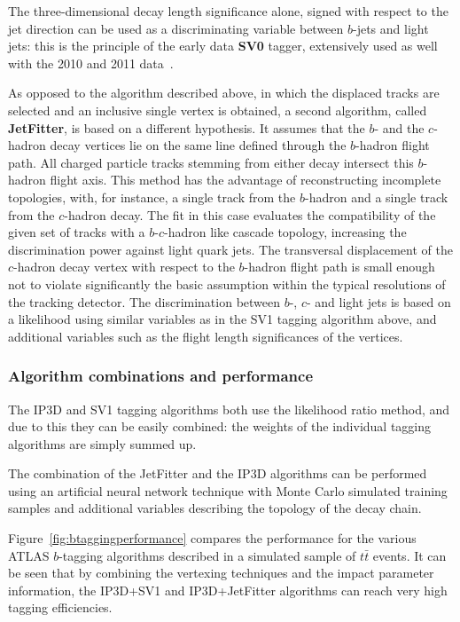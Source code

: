 The three-dimensional decay length significance alone,  signed with respect to the jet direction can be used as a discriminating variable between $b$-jets and light jets: this is the principle of the early data \textbf{SV0} tagger, extensively used as well with the 2010 and 2011 data~\cite{ATLAS-CONF-2010-042}.


As opposed to the algorithm described above, in which the displaced tracks are selected and an inclusive single vertex is obtained, a second algorithm, called \textbf{JetFitter}, is based on a different hypothesis. It assumes that the $b$- and the $c$-hadron decay vertices lie on the same line defined through the $b$-hadron flight path. All charged particle tracks stemming from either decay intersect this $b$-hadron flight axis. This method has the advantage of reconstructing incomplete topologies, with, for instance, a single track from the $b$-hadron and a single track from the $c$-hadron decay. The fit in this case evaluates the compatibility of the given set of tracks with a $b$-$c$-hadron like cascade topology, increasing the discrimination power against light quark jets.
The transversal displacement of the $c$-hadron decay vertex with respect to the $b$-hadron flight path is small enough not to violate significantly the basic assumption within the typical resolutions of the tracking detector.
The discrimination between $b$-, $c$- and light jets is based on a likelihood using similar variables as in the SV1 tagging algorithm above, and additional
variables such as the flight length significances of the vertices.

\subsubsection{Algorithm combinations and performance}

The IP3D and SV1 tagging algorithms both use the likelihood ratio method, and due to this they can be easily combined: the weights of the individual tagging algorithms are simply summed up. 

The combination of the JetFitter and the IP3D algorithms can be performed using an artificial neural network technique with Monte Carlo simulated training samples and additional variables describing the topology of the decay chain. 

Figure~\ref{fig:btaggingperformance} compares the performance for the various ATLAS $b$-tagging algorithms described in a simulated sample of $t\bar{t}$ events.
It can be seen that by combining the vertexing techniques and the impact parameter information, the IP3D+SV1 and IP3D+JetFitter algorithms can reach very high tagging efficiencies.

